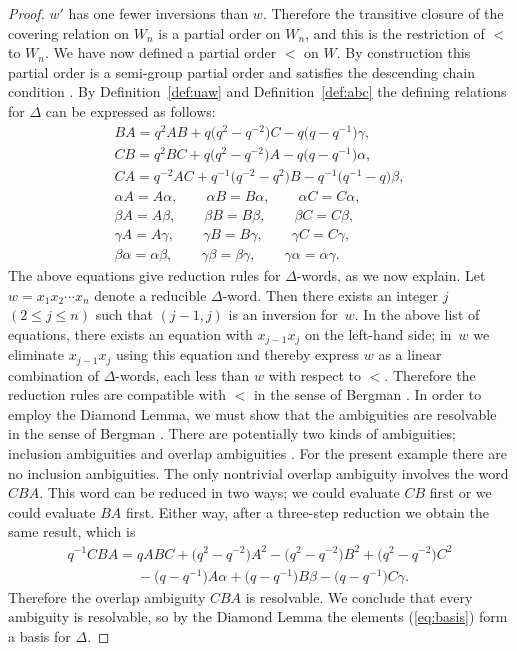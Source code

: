 \begin{proof}
$w'$ has one fewer inversions than $w$.
Therefore the transitive closure of the covering
relation on $W_n$ is a partial order on $W_n$, and this is
the restriction of
 $<$ to $W_n$.
We have now def\/ined a partial order $<$ on $W$.
By construction this partial order is
a semi-group partial order
\cite[p.~181]{berg} and satisf\/ies the
descending chain condition
\cite[p.~179]{berg}.
By Def\/inition~\ref{def:uaw} and
Def\/inition~\ref{def:abc}
the def\/ining relations for $\Delta $ can be expressed
as follows:
\begin{gather*}
 BA  =  q^2AB+q\big(q^2-q^{-2}\big)C-q\big(q-q^{-1}\big)\gamma,
\\
 CB  =  q^2BC+q\big(q^2-q^{-2}\big)A-q\big(q-q^{-1}\big)\alpha,
\\
 CA  =  q^{-2}AC+q^{-1}\big(q^{-2}-q^2\big)B-q^{-1}\big(q^{-1}-q\big)\beta,
\\
 \alpha A = A \alpha,
  \qquad
\alpha B = B \alpha,
  \qquad
\alpha C = C \alpha,
\\
 \beta A = A \beta,
  \qquad
\beta B = B \beta,
  \qquad
\beta C = C \beta,
\\
 \gamma A = A \gamma,
  \qquad
\gamma B = B \gamma,
  \qquad
\gamma C = C \gamma,
\\
 \beta \alpha = \alpha \beta,
  \qquad
\gamma \beta = \beta \gamma,
  \qquad
\gamma \alpha = \alpha \gamma.
\end{gather*}
The above equations give reduction rules
for $\Delta$-words,
as we now explain.
Let $w=x_1x_2\cdots x_n$ denote a  reducible $\Delta $-word.
Then there exists an integer $j$ $(2 \leq j \leq n)$
such that $(j-1,j)$ is an inversion for~$w$.
In the above list of equations,
there exists an equation
with $x_{j-1}x_j$ on the left-hand side;
in~$w$ we eliminate $x_{j-1}x_j$ using this equation
and thereby express $w$ as a linear combination of
$\Delta $-words, each less than $w$ with respect to $<$.
Therefore
the reduction rules are compatible
with $<$ in the sense of Bergman \cite[p.~181]{berg}.
In order to employ the Diamond Lemma,
we must show that
the ambiguities
are resolvable in the sense of Bergman
\cite[p.~181]{berg}.
There are potentially two kinds of ambiguities; inclusion
ambiguities and overlap ambiguities
\cite[p.~181]{berg}.
For the present example there are no inclusion ambiguities.
The only nontrivial overlap ambiguity
involves the word
$CBA$. This word can be reduced
in two ways; we could evaluate $CB$ f\/irst or we could
evaluate $BA$ f\/irst.
 Either way, after a three-step reduction
we obtain the same result, which is
\begin{gather*}
 q^{-1}CBA = qABC
+\big(q^2-q^{-2}\big)A^2
-\big(q^2-q^{-2}\big)B^2
+\big(q^2-q^{-2}\big)C^2
\\
\phantom{q^{-1}CBA =}{}
- \big(q-q^{-1}\big)A \alpha
+ \big(q-q^{-1}\big)B \beta
- \big(q-q^{-1}\big)C \gamma .
\end{gather*}
Therefore the
overlap ambiguity $CBA$ is re\-sol\-vable.
We conclude that every  ambiguity is
re\-sol\-vable, so
by the Diamond Lemma
\cite[Theorem~1.2]{berg}
the elements
(\ref{eq:basis}) form a basis for
$\Delta $.
\end{proof}

